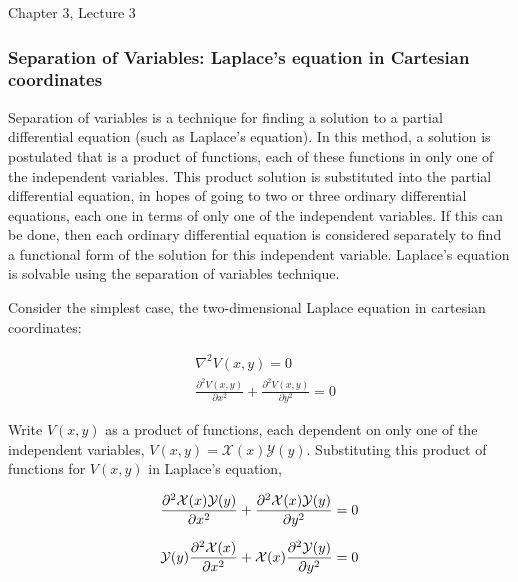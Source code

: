 \documentclass[12pt]{article}
\begin{document}
\begin{flushright} {\color{blue} Chapter 3, Lecture 3} \end{flushright}
\begin{flushleft}

\subsubsection*{\color{myblue} \bf Separation of Variables: Laplace's equation in Cartesian coordinates}

Separation of variables is a technique for finding a solution to a partial differential equation (such as Laplace's equation).  In this method, a solution is postulated that is a product of functions, each of these functions in only one of the independent variables.  This product solution is substituted into the partial differential equation, in hopes of going to two or three ordinary differential equations, each one in terms of only one of the independent variables.  If this can be done, then each ordinary differential equation is considered separately to find a functional form of the solution for this independent variable.  Laplace's equation is solvable using the separation of variables technique.

Consider the simplest case, the two-dimensional Laplace equation in cartesian coordinates:

\begin{equation*}
\begin{aligned}
& \nabla^{2}V(x,y) = 0 \\[6pt]
& \frac{\partial^{2} V(x,y)}{\partial x^{2}} + \frac{\partial^{2} V(x,y)}{\partial y^{2}} = 0
\end{aligned}
\end{equation*}

Write $V(x,y)$ as a product of functions, each dependent on only one of the independent variables, $V(x,y)=\mathcal{X}(x)\mathcal{Y}(y)$.  Substituting this product of functions for $V(x,y)$ in Laplace's equation,

\begin{align}
& \frac{\partial^{2} \mathcal{X}(x)\mathcal{Y}(y)}{\partial x^{2}} + \frac{\partial^{2} \mathcal{X}(x)\mathcal{Y}(y)}{\partial y^{2}} = 0 \notag \\[6pt]
&  \mathcal{Y}(y)\frac{\partial^{2} \mathcal{X}(x)}{\partial x^{2}} + \mathcal{X}(x)\frac{\partial^{2} \mathcal{Y}(y)}{\partial y^{2}} = 0 \label{eq:productthere}
\end{align}


\end{flushleft}
\end{document}
